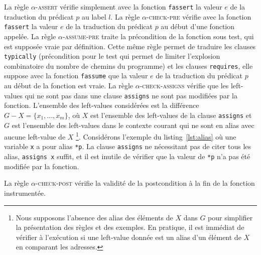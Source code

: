 La règle \textsc{$\alpha$-assert} vérifie simplement avec la fonction
\lstinline'fassert' la valeur $e$ de la traduction du prédicat $p$ au label $l$.
La règle \textsc{$\alpha$-check-pre} vérifie avec la fonction
\lstinline'fassert' la valeur $e$ de la traduction du prédicat $p$ au début
d'une fonction appelée.
La règle \textsc{$\alpha$-assume-pre} traite la précondition de la fonction sous
test, qui est supposée vraie par définition.
Cette même règle permet de traduire les clauses \lstinline'typically'
(précondition pour le test qui permet de limiter l'explosion combinatoire du
nombre de chemins du programme) et les clauses \lstinline'requires', elle
suppose avec la fonction \lstinline'fassume' que la valeur $e$ de la
traduction du prédicat $p$ au début de la fonction est vraie.
La règle \textsc{$\alpha$-check-assigns} vérifie que les left-values qui ne sont
pas dans une clause \lstinline'assigns' ne sont pas modifiées par la fonction.
L'ensemble des left-values considérées est la différence
$G-X = \{x_1, ..., x_m\}$, où  $X$ est l'ensemble des left-values de la clause
\lstinline'assigns' et $G$ est l'ensemble des left-values dans le
contexte courant qui ne sont en alias avec aucune left-value de $X$
\footnote{
  Nous supposons l'absence des alias des éléments de $X$ dans $G$ pour
  simplifier la présentation des règles et des exemples.
  En pratique, il est immédiat de vérifier à l'exécution si une left-value
  donnée est un alias d'un élément de $X$ en comparant les adresses.
}.
Considérons l'exemple du listing~\ref{lst:alias} où une variable \lstinline'x'
a pour alias \lstinline'*p'.
La clause \lstinline'assigns' ne nécessitant pas de citer tous les alias,
\lstinline'assigns x' suffit, et il est inutile de vérifier que la valeur de
\lstinline'*p' n'a pas été modifiée par la fonction.



La règle \textsc{$\alpha$-check-post} vérifie la validité de la postcondition
à la fin de la fonction instrumentée.

